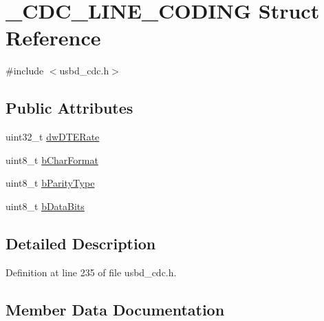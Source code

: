 \hypertarget{struct___c_d_c___l_i_n_e___c_o_d_i_n_g}{}\section{\+\_\+\+C\+D\+C\+\_\+\+L\+I\+N\+E\+\_\+\+C\+O\+D\+I\+NG Struct Reference}
\label{struct___c_d_c___l_i_n_e___c_o_d_i_n_g}


{\ttfamily \#include $<$usbd\+\_\+cdc.\+h$>$}

\subsection*{Public Attributes}
\begin{DoxyCompactItemize}
\item 
uint32\+\_\+t \hyperlink{struct___c_d_c___l_i_n_e___c_o_d_i_n_g_aeca9d053bfd185bc6b70911197442398}{dw\+D\+T\+E\+Rate}
\item 
uint8\+\_\+t \hyperlink{struct___c_d_c___l_i_n_e___c_o_d_i_n_g_a5c0251985f51927746b57e4c800ae9c7}{b\+Char\+Format}
\item 
uint8\+\_\+t \hyperlink{struct___c_d_c___l_i_n_e___c_o_d_i_n_g_a737b276dd2599610b3cf4783c80e725c}{b\+Parity\+Type}
\item 
uint8\+\_\+t \hyperlink{struct___c_d_c___l_i_n_e___c_o_d_i_n_g_a6764726aafd5b442bf5a1ecb39ffeb96}{b\+Data\+Bits}
\end{DoxyCompactItemize}


\subsection{Detailed Description}


Definition at line 235 of file usbd\+\_\+cdc.\+h.



\subsection{Member Data Documentation}
\mbox{\label{struct___c_d_c___l_i_n_e___c_o_d_i_n_g_a5c0251985f51927746b57e4c800ae9c7}} 
